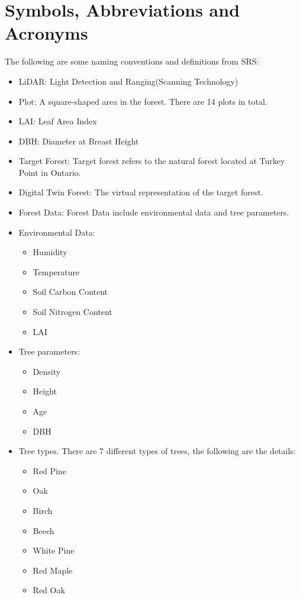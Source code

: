 \documentclass[12pt, titlepage]{article}
\begin{document}
\section{Symbols, Abbreviations and Acronyms}
The following are some naming conventions and definitions from SRS:
\begin{itemize}
\item LiDAR: Light Detection and Ranging(Scanning Technology)
\item Plot: A square-shaped area in the forest. There are 14 plots in total. 
\item LAI: Leaf Area Index
\item DBH: Diameter at Breast Height
\item Target Forest: Target forest refers to the natural forest located at Turkey
Point in Ontario.
\item Digital Twin Forest: The virtual representation of the target forest.
\item Forest Data: Forest Data include environmental data and tree parameters.
\item Environmental Data:
\begin{itemize}
    \item Humidity
    \item Temperature
    \item Soil Carbon Content
    \item Soil Nitrogen Content
    \item LAI 
\end{itemize}
\item Tree parameters: 
\begin{itemize}
    \item Density
    \item Height
    \item Age
    \item DBH 
\end{itemize}
\item Tree types. There are 7 different types of trees,
the following are the details:
\begin{itemize}
    \item Red Pine
    \item Oak
    \item Birch 
    \item Beech
    \item White Pine
    \item Red Maple
    \item Red Oak
\end{itemize}
\end{itemize}
\newpage
\end{document}
